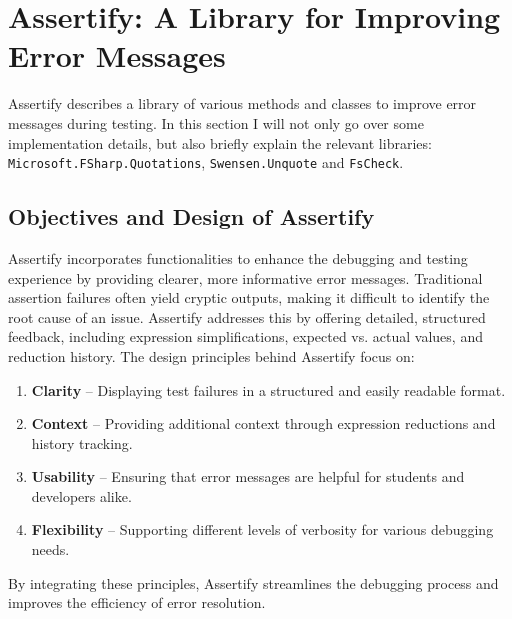 \chapter{Assertify: A Library for Improving Error Messages} %


Assertify describes a library of various methods and classes to improve error messages during testing.
In this section I will not only go over some implementation details, but also briefly explain the relevant libraries:
\texttt{Microsoft.FSharp.Quotations}, \texttt{Swensen.Unquote} and \texttt{FsCheck}.








\pagebreak
\section{Objectives and Design of Assertify} %



\noindent Assertify incorporates functionalities to enhance the debugging and testing experience by providing clearer, more informative error messages.
Traditional assertion failures often yield cryptic outputs, making it difficult to identify the root cause of an issue.
Assertify addresses this by offering detailed, structured feedback, including expression simplifications, expected vs. actual values, and reduction history.
The design principles behind Assertify focus on:
\begin{enumerate}[label=\textbf{(\arabic*)}]
    \item \textbf{Clarity} -- Displaying test failures in a structured and easily readable format.
    \item \textbf{Context} -- Providing additional context through expression reductions and history tracking.
    \item \textbf{Usability} -- Ensuring that error messages are helpful for students and developers alike.
    \item \textbf{Flexibility} -- Supporting different levels of verbosity for various debugging needs.
\end{enumerate}
By integrating these principles, Assertify streamlines the debugging process and improves the efficiency of error resolution.


